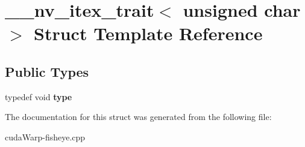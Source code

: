 \hypertarget{struct____nv__itex__trait_3_01unsigned_01char_01_4}{}\section{\+\_\+\+\_\+nv\+\_\+itex\+\_\+trait$<$ unsigned char $>$ Struct Template Reference}
\label{struct____nv__itex__trait_3_01unsigned_01char_01_4}
\subsection*{Public Types}
\begin{DoxyCompactItemize}
\item 
typedef void {\bfseries type}\hypertarget{struct____nv__itex__trait_3_01unsigned_01char_01_4_a2cb52cc1022519298f3e58c80a0c2cd7}{}\label{struct____nv__itex__trait_3_01unsigned_01char_01_4_a2cb52cc1022519298f3e58c80a0c2cd7}

\end{DoxyCompactItemize}


The documentation for this struct was generated from the following file\+:\begin{DoxyCompactItemize}
\item 
cuda\+Warp-\/fisheye.\+cpp\end{DoxyCompactItemize}
